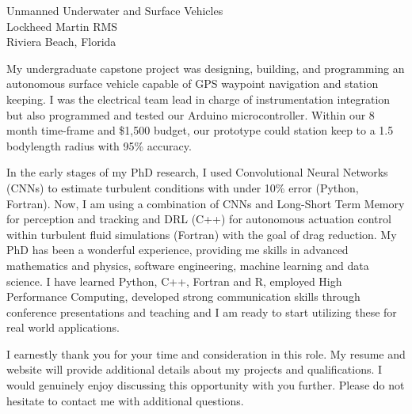 \documentclass[11pt]{letter} %
\begin{document}
\begin{letter}{Unmanned Underwater and Surface Vehicles \\
Lockheed Martin RMS \\
Riviera Beach, Florida
}

My undergraduate capstone project was designing, building, and programming an autonomous surface vehicle capable of GPS waypoint navigation and station keeping. I was the electrical team lead in charge of instrumentation integration but also programmed and tested our Arduino microcontroller. Within our 8 month time-frame and \$1,500 budget, our prototype could station keep to a 1.5 bodylength radius with 95\% accuracy. 

In the early stages of my PhD research, I used Convolutional Neural Networks (CNNs) to estimate turbulent conditions with under 10\% error (Python, Fortran). Now, I am using a combination of CNNs and Long-Short Term Memory for perception and tracking and DRL (C++) for autonomous actuation control within turbulent fluid simulations (Fortran) with the goal of drag reduction. My PhD has been a wonderful experience, providing me skills in advanced mathematics and physics, software engineering, machine learning and data science. I have learned Python, C++, Fortran and R, employed High Performance Computing, developed strong communication skills through conference presentations and teaching and I am ready to start utilizing these for real world applications. 
 

I earnestly thank you for your time and consideration in this role. My resume and website will provide additional details about my projects and qualifications. I would genuinely enjoy discussing this opportunity with you further. Please do not hesitate to contact me with additional questions.


\end{letter}
\end{document}
